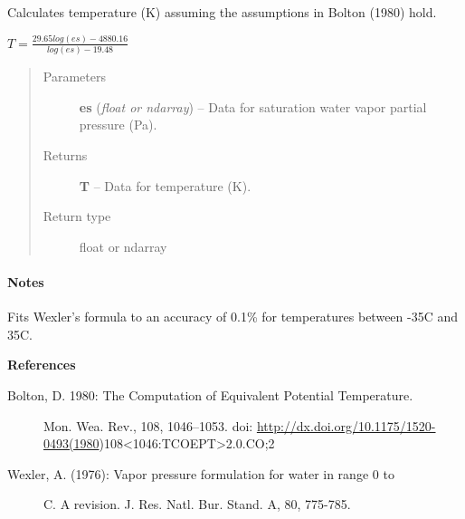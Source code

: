 \documentclass[letterpaper,10pt,english]{sphinxmanual}
\begin{document}
\begin{fulllineitems}
\label{atmos:atmos.equations.T_from_es_Bolton}
Calculates temperature (K) assuming the assumptions in Bolton (1980) hold.

\(T = \frac{29.65 log(es)-4880.16}{log(es)-19.48}\)
\begin{quote}\begin{description}
\item[{Parameters}] \leavevmode
\textbf{es} (\emph{float or ndarray}) -- Data for saturation water vapor partial pressure (Pa).

\item[{Returns}] \leavevmode
\textbf{T} --
Data for temperature (K).

\item[{Return type}] \leavevmode
float or ndarray

\end{description}\end{quote}
\paragraph{Notes}

Fits Wexler's formula to an accuracy of 0.1\% for temperatures between
-35C and 35C.

\textbf{References}
\begin{description}
\item[{Bolton, D. 1980: The Computation of Equivalent Potential Temperature.}] \leavevmode
Mon. Wea. Rev., 108, 1046–1053.
doi: \href{http://dx.doi.org/10.1175/1520-0493(1980}{http://dx.doi.org/10.1175/1520-0493(1980})108\textless{}1046:TCOEPT\textgreater{}2.0.CO;2

\item[{Wexler, A. (1976): Vapor pressure formulation for water in range 0 to}]  C. A revision. J. Res. Natl. Bur. Stand. A, 80, 775-785.

\end{description}

\end{fulllineitems}

\end{document}

